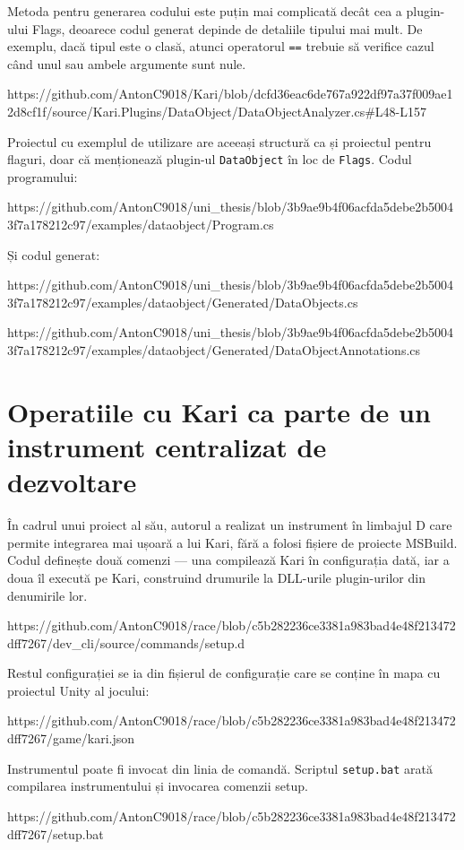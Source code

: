\documentclass[a4paper,12pt]{report}
\begin{document}
Metoda pentru generarea codului este puțin mai complicată decât cea a plugin-ului Flags, deoarece codul generat depinde de detaliile tipului mai mult.
De exemplu, dacă tipul este o clasă, atunci operatorul \texttt{==} trebuie să verifice cazul când unul sau ambele argumente sunt nule. 

https://github.com/AntonC9018/Kari/blob/dcfd36eac6de767a922df97a37f009ae12d8cf1f/source/Kari.Plugins/DataObject/DataObjectAnalyzer.cs#L48-L157

Proiectul cu exemplul de utilizare are aceeași structură ca și proiectul pentru flaguri, doar că menționează plugin-ul \texttt{DataObject} în loc de \texttt{Flags}.
Codul programului:

https://github.com/AntonC9018/uni_thesis/blob/3b9ae9b4f06acfda5debe2b50043f7a178212c97/examples/dataobject/Program.cs

Și codul generat:

https://github.com/AntonC9018/uni_thesis/blob/3b9ae9b4f06acfda5debe2b50043f7a178212c97/examples/dataobject/Generated/DataObjects.cs

https://github.com/AntonC9018/uni_thesis/blob/3b9ae9b4f06acfda5debe2b50043f7a178212c97/examples/dataobject/Generated/DataObjectAnnotations.cs

\section{Operatiile cu Kari ca parte de un instrument centralizat de dezvoltare}

În cadrul unui proiect al său, autorul a realizat un instrument în limbajul D care permite integrarea mai ușoară a lui Kari, fără a folosi fișiere de proiecte MSBuild.
Codul definește două comenzi — una compilează Kari în configurația dată, iar a doua îl execută pe Kari, construind drumurile la DLL-urile plugin-urilor din denumirile lor.

https://github.com/AntonC9018/race/blob/c5b282236ce3381a983bad4e48f213472dff7267/dev_cli/source/commands/setup.d

Restul configurației se ia din fișierul de configurație care se conține în mapa cu proiectul Unity al jocului:

https://github.com/AntonC9018/race/blob/c5b282236ce3381a983bad4e48f213472dff7267/game/kari.json

Instrumentul poate fi invocat din linia de comandă.
Scriptul \texttt{setup.bat} arată compilarea instrumentului și invocarea comenzii setup.

https://github.com/AntonC9018/race/blob/c5b282236ce3381a983bad4e48f213472dff7267/setup.bat
\end{document}

